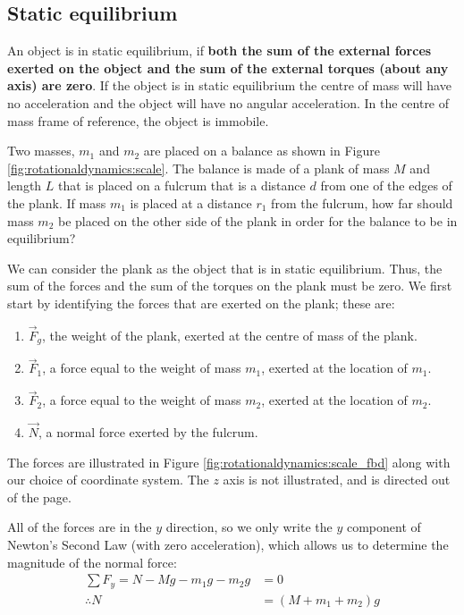 \subsection{Static equilibrium}
An object is in static equilibrium, if \textbf{both the sum of the external forces exerted on the object and the sum of the external torques (about any axis) are zero}. If the object is in static equilibrium the centre of mass will have no acceleration and the object will have no angular acceleration. In the centre of mass frame of reference, the object is immobile. 
\vspace{-0.25cm}
\begin{example}{

 Two masses, $m_1$ and $m_2$ are placed on a balance as shown in Figure \ref{fig:rotationaldynamics:scale}. The balance is made of a plank of mass $M$ and length $L$ that is placed on a fulcrum that is a distance $d$ from one of the edges of the plank. If mass $m_1$ is placed at a distance $r_1$ from the fulcrum, how far should mass $m_2$ be placed on the other side of the plank in order for the balance to be in equilibrium?}
We can consider the plank as the object that is in static equilibrium. Thus, the sum of the forces and the sum of the torques on the plank must be zero. We first start by identifying the forces that are exerted on the plank; these are:
\begin{enumerate}
\item $\vec F_g$, the weight of the plank, exerted at the centre of mass of the plank.
\item $\vec F_1$, a force equal to the weight of mass $m_1$, exerted at the location of $m_1$. 
\item $\vec F_2$, a force equal to the weight of mass $m_2$, exerted at the location of $m_2$.
\item $\vec N$, a normal force exerted by the fulcrum.
\end{enumerate} 
The forces are illustrated in Figure \ref{fig:rotationaldynamics:scale_fbd} along with our choice of coordinate system. The $z$ axis is not illustrated, and is directed out of the page. 

All of the forces are in the $y$ direction, so we only write the $y$ component of Newton's Second Law (with zero acceleration), which allows us to determine the magnitude of the normal force:
\begin{align*}
\sum F_y = N - Mg -m_1g - m_2 g &=0\\
\therefore N &= (M+m_1+m_2) g
\end{align*}


\end{example}
